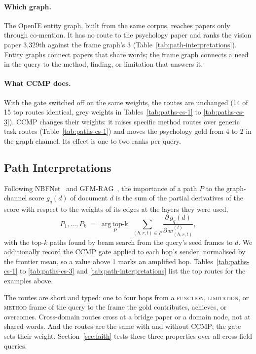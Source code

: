 \paragraph{Which graph.}
The OpenIE entity graph, built from the same corpus, reaches papers only through co-mention. It has
no route to the psychology paper and ranks the vision paper 3{,}329th against the frame graph's 3
(Table~\ref{tab:path-interpretations}). Entity graphs connect papers that share words; the frame
graph connects a need in the query to the method, finding, or limitation that answers it.

\paragraph{What CCMP does.}
With the gate switched off on the same weights, the routes are unchanged (14 of 15 top routes
identical, grey weights in Tables~\ref{tab:paths-cs-1} to \ref{tab:paths-cs-3}). CCMP changes their
weights: it raises specific method routes over generic task routes (Table~\ref{tab:paths-cs-1}) and
moves the psychology gold from 4 to 2 in the graph channel. Its effect is one to two ranks per query.

\subsection{Path Interpretations}
\label{sec:paths}

Following NBFNet~\cite{nbfnet} and GFM-RAG~\cite{gfmrag}, the importance of a path $P$ to the
graph-channel score $g_q(d)$ of document $d$ is the sum of the partial derivatives of the score with
respect to the weights of its edges at the layers they were used,
\begin{equation}
  P_1, \dots, P_k \;=\; \operatorname*{arg\,top\text{-}k}_{P}\;
  \sum_{(h, r, t)\in P} \frac{\partial\, g_q(d)}{\partial\, w^{(l)}_{(h,r,t)}},
  \label{eq:path-interp}
\end{equation}
with the top-$k$ paths found by beam search from the query's seed frames to $d$. We additionally
record the CCMP gate applied to each hop's sender, normalised by the frontier mean, so a value above
1 marks an amplified hop. Tables~\ref{tab:paths-cs-1} to \ref{tab:paths-cs-3} and
\ref{tab:path-interpretations} list the top routes for the examples above.

The routes are short and typed: one to four hops from a \textsc{function}, \textsc{limitation}, or
\textsc{method} frame of the query to the frame the gold contributes, achieves, or overcomes.
Cross-domain routes cross at a bridge paper or a domain node, not at shared words. And the routes
are the same with and without CCMP; the gate sets their weight. Section~\ref{sec:faith} tests these
three properties over all cross-field queries.
